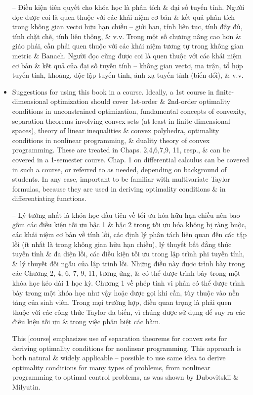 \documentclass{article}
\begin{document}
\begin{itemize}
    -- Điều kiện tiên quyết cho khóa học là phân tích \& đại số tuyến tính. Người đọc được coi là quen thuộc với các khái niệm cơ bản \& kết quả phân tích trong không gian vectơ hữu hạn chiều -- giới hạn, tính liên tục, tính đầy đủ, tính chặt chẽ, tính liên thông, \& v.v. Trong một số chương nâng cao hơn \& giáo phái, cần phải quen thuộc với các khái niệm tương tự trong không gian metric \& Banach. Người đọc cũng được coi là quen thuộc với các khái niệm cơ bản \& kết quả của đại số tuyến tính -- không gian vectơ, ma trận, tổ hợp tuyến tính, khoảng, độc lập tuyến tính, ánh xạ tuyến tính (biến đổi), \& v.v.
    \item {\sf Suggestions for using this book in a course.} Ideally, a 1st course in finite-dimensional optimization should cover 1st-order \& 2nd-order optimality conditions in unconstrained optimization, fundamental concepts of convexity, separation theorems involving convex sets (at least in finite-dimensional spaces), theory of linear inequalities \& convex polyhedra, optimality conditions in nonlinear programming, \& duality theory of convex programming. These are treated in Chaps. 2,4,6,7,9, 11, resp., \& can be covered in a 1-semester course. Chap. 1 on differential calculus can be covered in such a course, or referred to as needed, depending on background of students. In any case, important to be familiar with multivariate Taylor formulas, because they are used in deriving optimality conditions \& in differentiating functions.

    -- Lý tưởng nhất là khóa học đầu tiên về tối ưu hóa hữu hạn chiều nên bao gồm các điều kiện tối ưu bậc 1 \& bậc 2 trong tối ưu hóa không bị ràng buộc, các khái niệm cơ bản về tính lồi, các định lý phân tách liên quan đến các tập lồi (ít nhất là trong không gian hữu hạn chiều), lý thuyết bất đẳng thức tuyến tính \& đa diện lồi, các điều kiện tối ưu trong lập trình phi tuyến tính, \& lý thuyết đối ngẫu của lập trình lồi. Những điều này được trình bày trong các Chương 2, 4, 6, 7, 9, 11, tương ứng, \& có thể được trình bày trong một khóa học kéo dài 1 học kỳ. Chương 1 về phép tính vi phân có thể được trình bày trong một khóa học như vậy hoặc được gọi khi cần, tùy thuộc vào nền tảng của sinh viên. Trong mọi trường hợp, điều quan trọng là phải quen thuộc với các công thức Taylor đa biến, vì chúng được sử dụng để suy ra các điều kiện tối ưu \& trong việc phân biệt các hàm.

    This [course] emphasizes use of separation theorems for convex sets for deriving optimality conditions for nonlinear programming. This approach is both natural \& widely applicable -- possible to use same idea to derive optimality conditions for many types of problems, from nonlinear programming to optimal control problems, as was shown by {\sc Dubovitskii \& Milyutin}.


\end{itemize}
\end{document}
